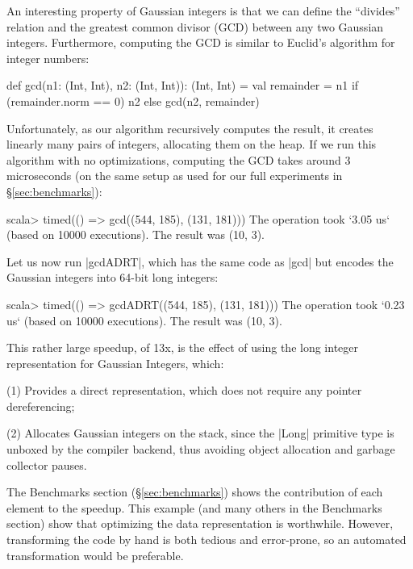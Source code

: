An interesting property of Gaussian integers is that we can define the
``divides'' relation and the greatest common divisor (GCD) between any
two Gaussian integers. Furthermore, computing the GCD is similar to
Euclid's algorithm for integer numbers:

\begin{lstlisting-nobreak}
def gcd(n1: (Int, Int), n2: (Int, Int)): (Int, Int) = {
  val remainder = n1 %
  if (remainder.norm == 0) n2 else gcd(n2, remainder)
}
\end{lstlisting-nobreak}

Unfortunately, as our algorithm recursively computes the result, it creates linearly many pairs of integers, allocating them on the heap. If we run this algorithm with no optimizations, computing the GCD takes around 3 microseconds (on the same setup as used for our full experiments in \S\ref{sec:benchmarks}):

\begin{lstlisting-nobreak}
scala> timed(() => gcd((544, 185), (131, 181)))
The operation took `3.05 us` (based on 10000 executions).
The result was (10, 3).
\end{lstlisting-nobreak}

Let us now run |gcdADRT|, which has the same code as |gcd| but encodes the Gaussian integers into 64-bit long integers:

\begin{lstlisting-nobreak}
scala> timed(() => gcdADRT((544, 185), (131, 181)))
The operation took `0.23 us` (based on 10000 executions).
The result was (10, 3).
\end{lstlisting-nobreak}

This rather large speedup, of 13x, is the effect of using the long integer representation for Gaussian Integers, which:

\begin{compactitem}
  \item[(1)] Provides a direct representation, which does not require any pointer dereferencing;
  \item[(2)] Allocates Gaussian integers on the stack, since the |Long| primitive type is unboxed by the compiler backend, thus avoiding object allocation and garbage collector pauses.
\end{compactitem}

The Benchmarks section (\S\ref{sec:benchmarks}) shows the contribution of each element to the speedup. This example (and many others in the Benchmarks section) show that optimizing the data representation is worthwhile. However, transforming the code by hand is both tedious and error-prone, so an automated transformation would be preferable.

